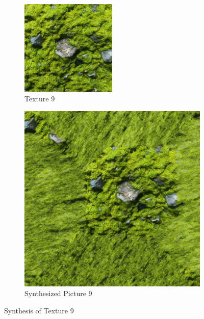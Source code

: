 \documentclass{article}
\begin{document}
\begin{figure}[htbp!]
    \centering
    \begin{subfigure}[b]{0.49\textwidth}
        \centering
        \includegraphics[width=0.5\textwidth]{../Code/Textures/9.png}
        \caption{Texture 9}
        \label{fig:original-9}
    \end{subfigure}
    \hfill %
    \begin{subfigure}[b]{0.49\textwidth}
        \centering
        \includegraphics[width=\textwidth]{../Result/9.png}
        \caption{Synthesized Picture 9}
        \label{fig:synthesized-9}
    \end{subfigure}
    \caption{Synthesis of Texture 9}
    \label{fig:synthesis-9}
\end{figure}
\end{document}

